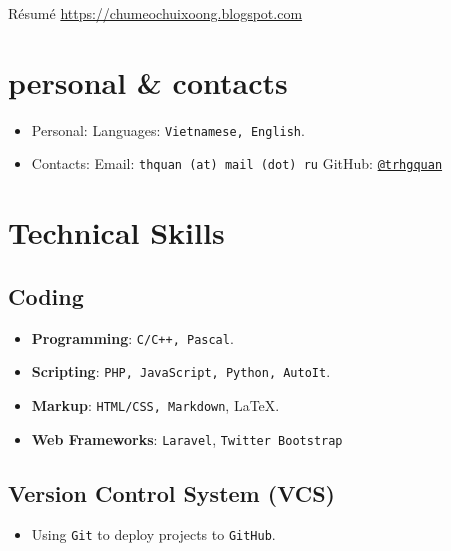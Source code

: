 \documentclass{article}
\renewcommand{\maketitle}{
    \begin{center}
        {\huge\bfseries\theauthor}
        \linebreak\linebreak
        R\'esum\'e
        \linebreak
        \url{https://chumeochuixoong.blogspot.com}
    \end{center}
}
\begin{document}
    \author{Quan, Tran Hoang}
    \maketitle

    \section{personal \& contacts}
        \begin{itemize}
            \item Personal:
                \subitem Languages: \texttt{Vietnamese, English}.
            \item Contacts:
                \subitem Email: \texttt{thquan (at) mail (dot) ru}
                \subitem GitHub: \texttt{\href{https://github.com/trhgquan}{@trhgquan}}
        \end{itemize}

    \section{Technical Skills}
        \subsection{Coding}
        \begin{itemize}
            \item \textbf{Programming}: \texttt{C/C++, Pascal}.
            \item \textbf{Scripting}: \texttt{PHP, JavaScript, Python, AutoIt}.
            \item \textbf{Markup}: \texttt{HTML/CSS, Markdown}, \LaTeX.
            \item \textbf{Web Frameworks}: \texttt{Laravel}\cite{laravel}, \texttt{Twitter Bootstrap}\cite{bootstrap}
        \end{itemize}

        \subsection{Version Control System (VCS)}
        \begin{itemize}
            \item Using \texttt{Git} to deploy projects to \texttt{GitHub}.
        \end{itemize}
\end{document}
